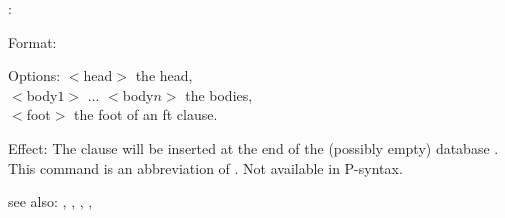 \azft:

Format: 

Options: $<$head$>$ the head,\\
	 $<$body$1>$ ... $<$body$n>$ the bodies,\\
	 $<$foot$>$ the foot of an ft clause.

Effect: The clause 
        will be inserted at the end
	of the (possibly empty) database .
	This command is an abbreviation of 
        .
        Not available in P-syntax.

see also: \az, \azhn, \consult, \destroy, \replace
